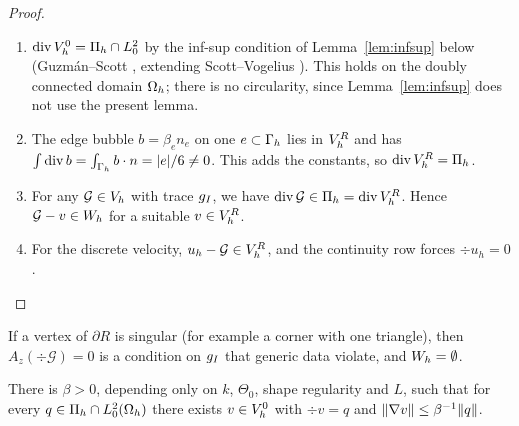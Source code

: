 \begin{proof}
\begin{enumerate}
\item $\operatorname{div}V_h^0=\Pi_h\cap L^2_0$ by the inf-sup condition of Lemma~\ref{lem:infsup} below (Guzm\'an--Scott \cite{GuzmanScott2019}, extending Scott--Vogelius \cite{ScottVogelius1985}). This holds on the doubly connected domain $\Omega_h$; there is no circularity, since Lemma~\ref{lem:infsup} does not use the present lemma.
\item The edge bubble $b=\beta_en_e$ on one $e\subset\Gamma_h$ lies in $V_h^R$ and has $\int\operatorname{div} b=\int_{\Gamma_h}b\cdot n=|e|/6\ne0$. This adds the constants, so $\operatorname{div}V_h^R=\Pi_h$.
\item For any $\mathcal G\in V_h$ with trace $g_I$, we have $\operatorname{div}\mathcal G\in\Pi_h=\operatorname{div}V_h^R$. Hence $\mathcal G-v\in W_h$ for a suitable $v\in V_h^R$.
\item For the discrete velocity, $u_h-\mathcal G\in V_h^R$, and the continuity row forces $\div u_h=0$.\qedhere
\end{enumerate}
\end{proof}

\begin{remark}\label{rem:corner}
If a vertex of $\partial R$ is singular (for example a corner with one triangle), then $A_z(\div\mathcal G)=0$ is a condition on $g_I$ that generic data violate, and $W_h=\emptyset$.
\end{remark}

\begin{lemma}\label{lem:infsup}
There is $\beta>0$, depending only on $k$, $\Theta_0$, shape regularity and $L$, such that for every $q\in\Pi_h\cap L^2_0(\Omega_h)$ there exists $v\in V_h^0$ with $\div v=q$ and $\lVert \nabla v\rVert\le\beta^{-1}\lVert q\rVert$.
\end{lemma}

